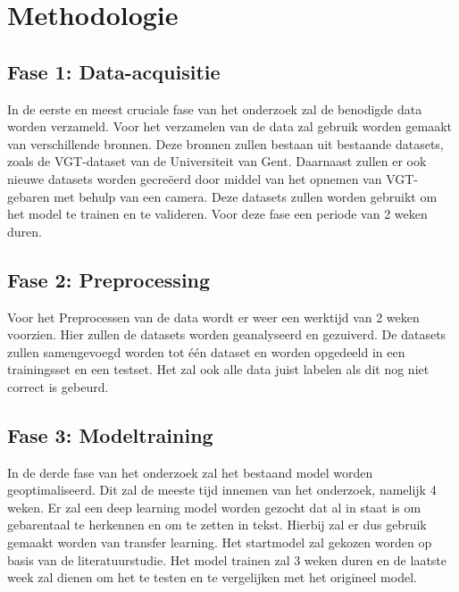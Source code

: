 
\section{Methodologie}%
\label{sec:methodologie}
\subsection{Fase 1: Data-acquisitie}
In de eerste en meest cruciale fase van het onderzoek zal de benodigde data worden verzameld.
Voor het verzamelen van de data zal gebruik worden gemaakt van verschillende bronnen.
Deze bronnen zullen bestaan uit bestaande datasets, zoals de VGT-dataset van de Universiteit van Gent.
Daarnaast zullen er ook nieuwe datasets worden gecreëerd door middel van het opnemen van VGT-gebaren met behulp van een camera.
Deze datasets zullen worden gebruikt om het model te trainen en te valideren.
Voor deze fase een periode van 2 weken duren.
\subsection{Fase 2: Preprocessing}
Voor het Preprocessen van de data wordt er weer een werktijd van 2 weken voorzien.
Hier zullen de datasets worden geanalyseerd en gezuiverd.
De datasets zullen samengevoegd worden tot één dataset en worden opgedeeld in een trainingsset en een testset.
Het zal ook alle data juist labelen als dit nog niet correct is gebeurd.
\subsection{Fase 3: Modeltraining}
In de derde fase van het onderzoek zal het bestaand model worden geoptimaliseerd.
Dit zal de meeste tijd innemen van het onderzoek, namelijk 4 weken.
Er zal een deep learning model worden gezocht dat al in staat is om gebarentaal te herkennen en om te zetten in tekst.
Hierbij zal er dus gebruik gemaakt worden van transfer learning.
Het startmodel zal gekozen worden op basis van de literatuurstudie.
Het model trainen zal 3 weken duren en de laatste week zal dienen om het te testen en te vergelijken met het origineel model.
